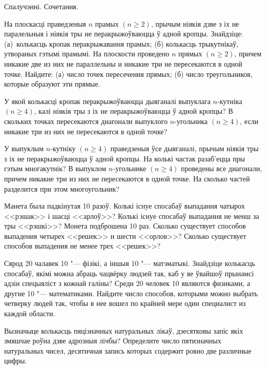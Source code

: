 \documentclass[12pt, a4paper]{article}
\begin{document}
\biLangHeader
{Спалучэнні.}
{Сочетания.}

\begin{problemList}

\problemItemSimple
{На плоскасці праведзеныя $n$ прамых $(n \ge 2)$, прычым ніякія дзве з іх не паралельныя
і ніякія тры не перакрыжоўваюцца ў адной кропцы. Знайдзіце: (а)~колькасць кропак перакрыжавання прамых;
(б) колькасць трыкутнікаў, утвораных гэтымі прамымі.}
{На плоскости проведено $n$ прямых $(n \ge 2)$, причем никакие две из
них не параллельны и никакие три не пересекаются в одной точке.
Найдите: (а) число точек пересечения прямых; (б) число треугольников,
которые образуют эти прямые.}

\bigskip

\problemItemSimple
{У якой колькасці кропак перакрыжоўваюцца дыяганалі выпуклага $n$-кутніка
$(n \ge 4)$, калі ніякія тры з іх не перакрыжоўваюцца ў адной кропцы?}
{В скольких точках пересекаются диагонали выпуклого $n$-угольника
$(n \ge 4)$, если никакие три из них не пересекаются в одной точке?}

\bigskip

\problemItemSimple
{У выпуклым $n$-кутніку $(n \ge 4)$ праведзеныя ўсе дыяганалі, прычым
ніякія тры з іх не перакрыжоўваюцца ў адной кропцы. На колькі частак разаб'ецца
пры гэтым многакутнік?}
{В выпуклом $n$-угольнике $(n \ge 4)$ проведены все диагонали, причем
никакие три из них не пересекаются в одной точке. На сколько частей
разделится при этом многоугольник?}

\bigskip

\problemItemSimple
{Манета была падкінутая 10 разоў. Колькі існуе спосабаў выпадання чатырох
<<рэшак>> і шасці <<арлоў>>?
Колькі існуе спосабаў выпадання не менш за тры <<рэшкі>>?}
{Монета подброшена 10 раз. Сколько существует способов выпадения
четырех <<решек>> и шести <<орлов>>? Сколько существует способов выпадения
не менее трех <<решек>>?}

\bigskip

\problemItemSimple
{Сярод 20 чалавек 10 "--- фізікі, а іншыя 10 "--- матэматыкі. Знайдзіце колькасць спосабаў,
якімі можна абраць чацвёрку людзей так, каб у яе ўвайшоў прынамсі адзін спецыяліст з кожнай галіны?}
{Среди 20 человек 10 являются физиками, а другие 10 "--- математиками.
Найдите число способов, которыми можно выбрать четверку людей так,
чтобы в нее вошел по крайней мере один специалист из каждой области.}

\bigskip

\problemItemSimple
{Вызначыце колькасць пяцізначных натуральных лікаў, дзесятковы запіс якіх змяшчае роўна дзве адрозныя лічбы?}
{Определите число пятизначных натуральных чисел, десятичная запись
которых содержит ровно две различные цифры.}


\end{problemList}
\end{document}
